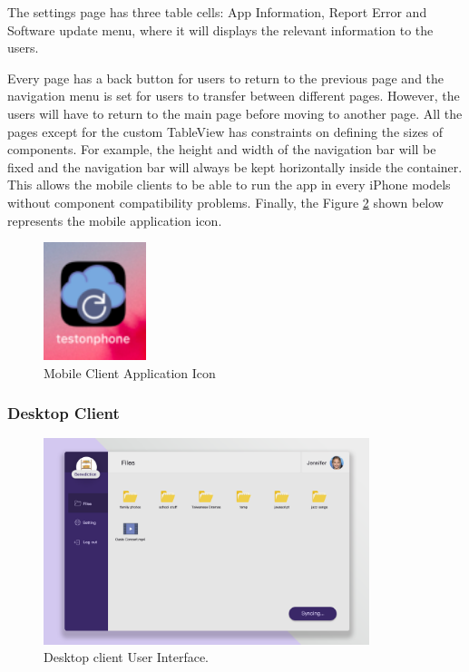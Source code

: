 \documentclass{article}
\begin{document}
The settings page has three table cells: App Information, Report Error and Software update menu, where it will displays the relevant information to the users.

Every page has a back button for users to return to the previous page and the navigation menu is set for users to transfer between different pages. However, the users will have to return to the main page before moving to another page. All the pages except for the custom TableView has constraints on defining the sizes of components. For example, the height and width of the navigation bar will be fixed and the navigation bar will always be kept horizontally inside the container. This allows the mobile clients to be able to run the app in every iPhone models without component compatibility problems. Finally, the Figure \ref{ex4} shown below represents the mobile application icon.
\newline
\begin{figure}[H]
\begin{center}
\includegraphics[width=3cm]{APPIcon.png}
\end{center}
\caption{Mobile Client Application Icon}\label{ex4}
\end{figure}

\subsubsection{Desktop Client}

\begin{figure}[H]
\begin{center}
\includegraphics[width=9.5cm]{desktop-client.png}
\end{center}
\caption{Desktop client User Interface.}\label{ex4}
\end{figure}
\end{document}
